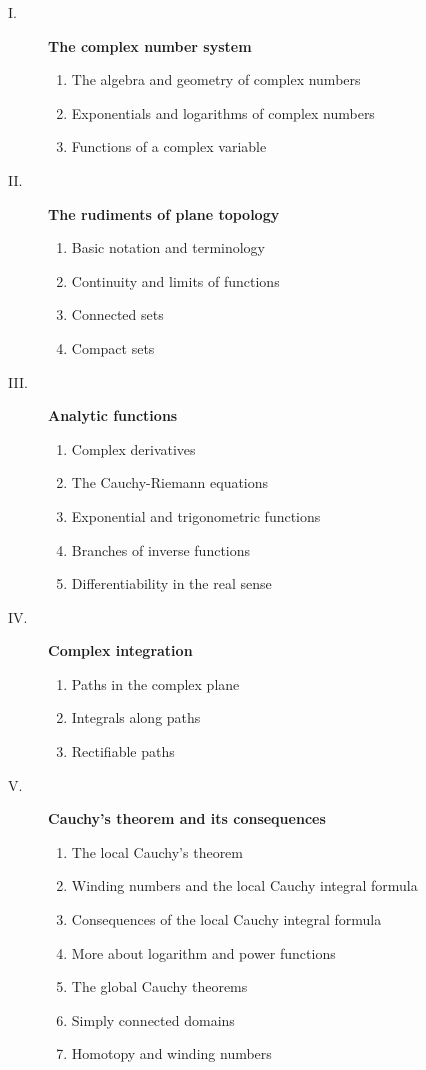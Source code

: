 \begin{description}
  \item[I.] \textbf{The complex number system}
  \begin{enumerate}
    \item The algebra and geometry of complex numbers
    \item Exponentials and logarithms of complex numbers
    \item Functions of a complex variable
  \end{enumerate}
  \item[II.] \textbf{The rudiments of plane topology}
  \begin{enumerate}
    \item Basic notation and terminology
    \item Continuity and limits of functions
    \item Connected sets
    \item Compact sets
  \end{enumerate}
  \item[III.] \textbf{Analytic functions}
  \begin{enumerate}
    \item Complex derivatives
    \item The Cauchy-Riemann equations
    \item Exponential and trigonometric functions
    \item Branches of inverse functions
    \item Differentiability in the real sense
  \end{enumerate}
  \item[IV.] \textbf{Complex integration}
  \begin{enumerate}
    \item Paths in the complex plane
    \item Integrals along paths
    \item Rectifiable paths
  \end{enumerate}
  \item[V.] \textbf{Cauchy's theorem and its consequences}
  \begin{enumerate}
    \item The local Cauchy's theorem
    \item Winding numbers and the local Cauchy integral formula
    \item Consequences of the local Cauchy integral formula
    \item More about logarithm and power functions
    \item The global Cauchy theorems
    \item Simply connected domains
    \item Homotopy and winding numbers
  \end{enumerate}
\end{description}
